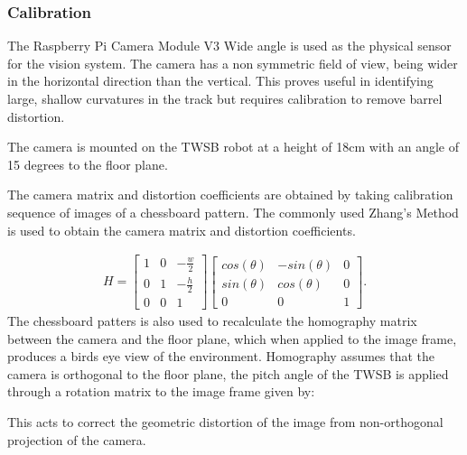         \subsubsection{Calibration}
        The Raspberry Pi Camera Module V3 Wide angle is used as the physical sensor for the vision system.
        The camera has a non symmetric field of view, being wider in the horizontal direction than the vertical.
        This proves useful in identifying large, shallow curvatures in the track 
        but requires calibration to remove barrel distortion. 

        The camera is mounted on the TWSB robot at a height of 18cm with an angle of 15 degrees to the floor plane.
        
       
        The camera matrix and distortion coefficients are obtained by taking calibration sequence of images of a 
        chessboard pattern. The commonly used Zhang's Method is used to obtain the camera matrix and distortion coefficients. 
       
        \begin{equation}
            \begin{aligned}
                H = \begin{bmatrix}
                    1 & 0 & -\frac{w}{2} \\
                    0 & 1 & -\frac{h}{2} \\
                    0 & 0 & 1
                \end{bmatrix}
                \begin{bmatrix}
                    cos(\theta) & -sin(\theta) & 0 \\
                    sin(\theta) & cos(\theta) & 0 \\
                    0 & 0 & 1
                \end{bmatrix}.
            \end{aligned}
            \label{eq:Homography Matrix}
        \end{equation}
        The chessboard patters is also used to recalculate the homography matrix between the camera and the floor plane, which when
        applied to the image frame, produces a birds eye view of the environment. 
        Homography assumes that the camera is orthogonal to the floor plane, the pitch angle of the TWSB is applied 
        through a rotation matrix to the image frame given by:
        
        This acts to correct the geometric distortion of the image from non-orthogonal projection of the camera. 

